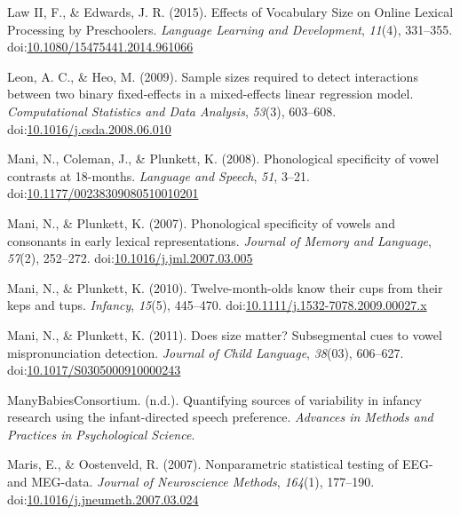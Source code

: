 \documentclass[man]{apa6}
\begin{document}
\leavevmode\hypertarget{ref-Law2015}{}%
Law II, F., \& Edwards, J. R. (2015). Effects of Vocabulary Size on Online Lexical Processing by Preschoolers. \emph{Language Learning and Development}, \emph{11}(4), 331--355. doi:\href{https://doi.org/10.1080/15475441.2014.961066}{10.1080/15475441.2014.961066}

\leavevmode\hypertarget{ref-Leon2009}{}%
Leon, A. C., \& Heo, M. (2009). Sample sizes required to detect interactions between two binary fixed-effects in a mixed-effects linear regression model. \emph{Computational Statistics and Data Analysis}, \emph{53}(3), 603--608. doi:\href{https://doi.org/10.1016/j.csda.2008.06.010}{10.1016/j.csda.2008.06.010}

\leavevmode\hypertarget{ref-Mani2008}{}%
Mani, N., Coleman, J., \& Plunkett, K. (2008). Phonological specificity of vowel contrasts at 18-months. \emph{Language and Speech}, \emph{51}, 3--21. doi:\href{https://doi.org/10.1177/00238309080510010201}{10.1177/00238309080510010201}

\leavevmode\hypertarget{ref-Mani2007}{}%
Mani, N., \& Plunkett, K. (2007). Phonological specificity of vowels and consonants in early lexical representations. \emph{Journal of Memory and Language}, \emph{57}(2), 252--272. doi:\href{https://doi.org/10.1016/j.jml.2007.03.005}{10.1016/j.jml.2007.03.005}

\leavevmode\hypertarget{ref-Mani2010kepstups}{}%
Mani, N., \& Plunkett, K. (2010). Twelve-month-olds know their cups from their keps and tups. \emph{Infancy}, \emph{15}(5), 445--470. doi:\href{https://doi.org/10.1111/j.1532-7078.2009.00027.x}{10.1111/j.1532-7078.2009.00027.x}

\leavevmode\hypertarget{ref-Mani2011}{}%
Mani, N., \& Plunkett, K. (2011). Does size matter? Subsegmental cues to vowel mispronunciation detection. \emph{Journal of Child Language}, \emph{38}(03), 606--627. doi:\href{https://doi.org/10.1017/S0305000910000243}{10.1017/S0305000910000243}

\leavevmode\hypertarget{ref-MB1}{}%
ManyBabiesConsortium. (n.d.). Quantifying sources of variability in infancy research using the infant-directed speech preference. \emph{Advances in Methods and Practices in Psychological Science}.

\leavevmode\hypertarget{ref-Maris2007}{}%
Maris, E., \& Oostenveld, R. (2007). Nonparametric statistical testing of EEG- and MEG-data. \emph{Journal of Neuroscience Methods}, \emph{164}(1), 177--190. doi:\href{https://doi.org/10.1016/j.jneumeth.2007.03.024}{10.1016/j.jneumeth.2007.03.024}
\end{document}
